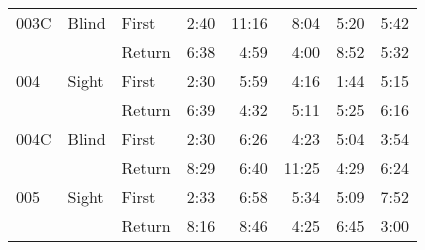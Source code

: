 \begin{table}[!htb]
\begin{tabular}{lllrrrrr}
003C & Blind & First &   2:40 &  11:16 &                                                  8:04 &                                                   5:20 &    5:42 \\
    &       & Return &   6:38 &   4:59 &                                                  4:00 &                                                   8:52 &    5:32 \\
004 & Sight & First &   2:30 &   5:59 &                                                  4:16 &                                                   1:44 &    5:15 \\
    &       & Return &   6:39 &   4:32 &                                                  5:11 &                                                   5:25 &    6:16 \\
004C & Blind & First &   2:30 &   6:26 &                                                  4:23 &                                                   5:04 &    3:54 \\
    &       & Return &   8:29 &   6:40 &                                                 11:25 &                                                   4:29 &    6:24 \\
005 & Sight & First &   2:33 &   6:58 &                                                  5:34 &                                                   5:09 &    7:52 \\
    &       & Return &   8:16 &   8:46 &                                                  4:25 &                                                   6:45 &    3:00 \\
\bottomrule
\end{tabular}
\end{table}

